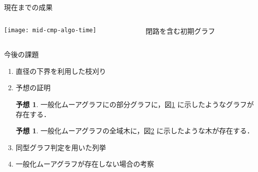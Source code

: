 \documentclass[dvipdfmx]{beamer}
\theoremstyle{definition}
\newtheorem{conj}[thm]{予想}
\begin{document}
\begin{frame}{現在までの成果}
  \begin{columns}
    \begin{column}{.6\textwidth}
      \centering
      \texttt{[image: mid-cmp-algo-time]}
      \label{fig:result}
    \end{column}
    \begin{column}{.4\textwidth}
      \centering
      \begin{figure}
        \centering
        \def\svgwidth{\textwidth}
        \resizebox{!}{.3\textheight}{
          
        }
        \caption{閉路を含む初期グラフ}
        \label{fig:initial-graph-cycle}
      \end{figure}
      \vspace{-2em}
      \begin{figure}
        \def\svgwidth{\textwidth}
        \resizebox{!}{.3\textheight}{
          
        }
        \label{fig:initial-graph-stree}
      \end{figure}
    \end{column}
  \end{columns}
\end{frame}

\begin{frame}{今後の課題}
  \begin{enumerate}
  \item 直径の下界を利用した枝刈り
  \item 予想の証明
    \begin{conj}
      一般化ムーアグラフにの部分グラフに，図\ref{fig:initial-graph-cycle}
      に示したようなグラフが存在する．
    \end{conj}
    \begin{conj}
      一般化ムーアグラフの全域木に，図\ref{fig:initial-graph-stree}
      に示したような木が存在する．
    \end{conj}
  \item 同型グラフ判定を用いた列挙
  \item 一般化ムーアグラフが存在しない場合の考察
  \end{enumerate}
\end{frame}
\end{document}
